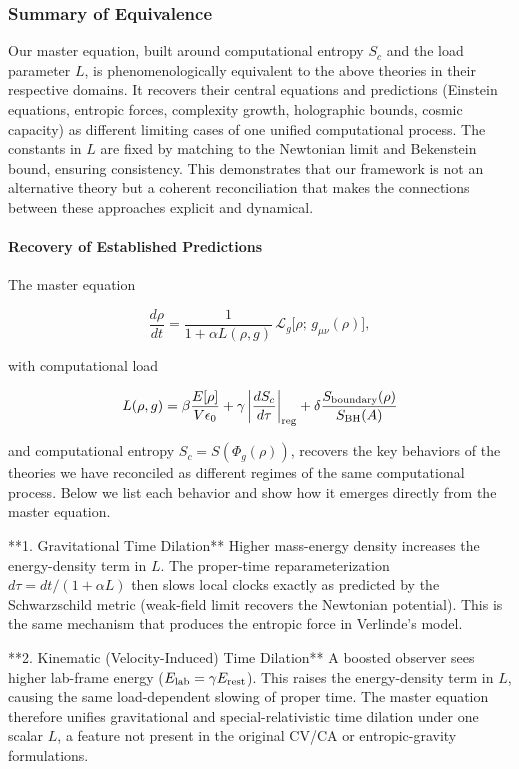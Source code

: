 \documentclass[reprint,amsmath,amssymb,aps,prd,preprintnumbers,superscriptaddress,longbibliography,10pt]{revtex4-2}
\begin{document}
\subsubsection{Summary of Equivalence}
Our master equation, built around computational entropy $  S_c  $ and the load parameter $  L  $, is phenomenologically equivalent to the above theories in their respective domains. It recovers their central equations and predictions (Einstein equations, entropic forces, complexity growth, holographic bounds, cosmic capacity) as different limiting cases of one unified computational process. The constants in $  L  $ are fixed by matching to the Newtonian limit and Bekenstein bound, ensuring consistency.
This demonstrates that our framework is not an alternative theory but a coherent reconciliation that makes the connections between these approaches explicit and dynamical.

\paragraph{Recovery of Established Predictions}

The master equation

$$
\frac{d\rho}{dt} = \frac{1}{1 + \alpha L(\rho,g)} \,\mathcal{L}_g\bigl[\rho;\, g_{\mu\nu}(\rho)\bigr],
$$

with computational load

$$
L(\rho,g) = \beta \frac{E[\rho]}{V \epsilon_0} + \gamma \left| \frac{d S_c}{d\tau} \right|_{\rm reg} + \delta \frac{S_{\rm boundary}(\rho)}{S_{\rm BH}(A)}
$$

and computational entropy $S_c = S(\Phi_g(\rho))$, recovers the key behaviors of the theories we have reconciled as different regimes of the same computational process. Below we list each behavior and show how it emerges directly from the master equation.

**1. Gravitational Time Dilation**  
Higher mass-energy density increases the energy-density term in $L$. The proper-time reparameterization $d\tau = dt / (1 + \alpha L)$ then slows local clocks exactly as predicted by the Schwarzschild metric (weak-field limit recovers the Newtonian potential). This is the same mechanism that produces the entropic force in Verlinde’s model.

**2. Kinematic (Velocity-Induced) Time Dilation**  
A boosted observer sees higher lab-frame energy ($E_{\rm lab} = \gamma E_{\rm rest}$). This raises the energy-density term in $L$, causing the same load-dependent slowing of proper time. The master equation therefore unifies gravitational and special-relativistic time dilation under one scalar $L$, a feature not present in the original CV/CA or entropic-gravity formulations.
\end{document}
